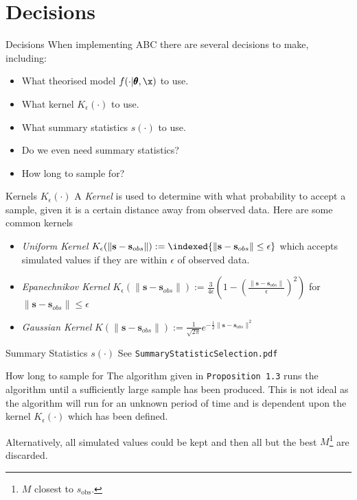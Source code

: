 \documentclass[11pt,a4paper]{article}
\begin{document}
\section*{Decisions}

  \begin{remark}{Decisions}
    When implementing ABC there are several decisions to make, including:
    \begin{itemize}
      \item What theorised model $f(\cdot|\pmb\theta,\x)$ to use.
      \item What kernel $K_\epsilon(\cdot)$ to use.
      \item What summary statistics $s(\cdot)$ to use.
      \item Do we even need summary statistics?
      \item How long to sample for?
    \end{itemize}
  \end{remark}

  \begin{proposition}{Kernels $K_\epsilon(\cdot)$}
    A \textit{Kernel} is used to determine with what probability to accept a sample, given it is a certain distance away from observed data. Here are some common kernels
    \begin{itemize}
      \item \textit{Uniform Kernel} $K_\epsilon(\|\mathbf{s}-\mathbf{s}_{obs}\|):=\indexed\{\|\mathbf{s}-\mathbf{s}_{obs}\|\leq\epsilon\}$ which accepts simulated values if they are within $\epsilon$ of observed data.
      \item \textit{Epanechnikov Kernel} $K_\epsilon(\|\mathbf{s}-\mathbf{s}_{obs}\|):=\frac3{4\epsilon}\left(1-\left(\frac{\|\mathbf{s}-\mathbf{s}_{obs}\|}\epsilon\right)^2\right)$ for $\|\mathbf{s}-\mathbf{s}_{obs}\|\leq\epsilon$
      \item \textit{Gaussian Kernel} $K(\|\mathbf{s}-\mathbf{s}_{obs}\|):=\frac1{\sqrt{2\pi}}e^{-\frac12\|\mathbf{s}-\mathbf{s}_{obs}\|^2}$
    \end{itemize}
  \end{proposition}

  \begin{proposition}{Summary Statistics $s(\cdot)$}
    See \texttt{SummaryStatisticSelection.pdf}
  \end{proposition}

  \begin{proposition}{How long to sample for}
    The algorithm given in \texttt{Proposition 1.3} runs the algorithm until a sufficiently large sample has been produced. This is not ideal as the algorithm will run for an unknown period of time and is dependent upon the kernel $K_\epsilon(\cdot)$ which has been defined.
    \par Alternatively, all simulated values could be kept and then all but the best $M$\footnote{$M$ closest to $s_\text{obs}$.} are discarded.
  \end{proposition}
\end{document}
